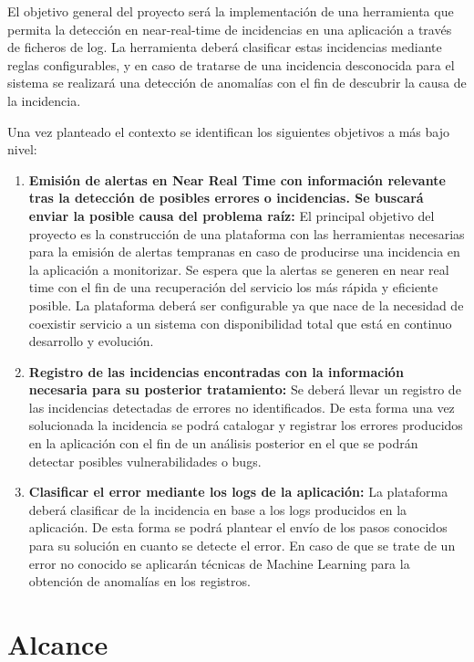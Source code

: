 El objetivo general del proyecto será la implementación de una herramienta que permita la detección en near-real-time de incidencias en una aplicación a través de ficheros de log. La herramienta deberá clasificar estas incidencias mediante reglas configurables, y en caso de tratarse de una incidencia desconocida para el sistema se realizará una detección de anomalías con el fin de descubrir la causa de la incidencia.

Una vez planteado el contexto se identifican los siguientes objetivos a más bajo nivel:

\begin{enumerate}
	\item \textbf{Emisión de alertas en Near Real Time con información relevante tras la detección de posibles errores o
incidencias. Se buscará enviar la posible causa del problema raíz:} El principal objetivo del proyecto es la construcción de una plataforma con las herramientas necesarias para la emisión de alertas tempranas en caso de producirse una incidencia en la aplicación a monitorizar. Se espera que la alertas se generen en near real time con el fin de una recuperación del servicio los más rápida y eficiente posible. La plataforma deberá ser configurable ya que nace de la necesidad de coexistir servicio a un sistema con disponibilidad total que está en continuo desarrollo y evolución.
	\item \textbf{Registro de las incidencias encontradas con la información necesaria para su posterior
tratamiento:} Se deberá llevar un registro de las incidencias detectadas de errores no identificados. De esta forma una vez solucionada la incidencia se podrá catalogar y registrar los errores producidos en la aplicación con el fin de un análisis posterior en el que se podrán detectar posibles vulnerabilidades o bugs.
	\item \textbf{Clasificar el error mediante los logs de la aplicación:} La plataforma deberá clasificar de la incidencia en base a los logs producidos en la aplicación. De esta forma se podrá plantear el envío de los pasos conocidos para su solución en cuanto se detecte el error. En caso de que se trate de un error no conocido se aplicarán técnicas de Machine Learning para la obtención de anomalías en los registros.
\end{enumerate}
	


\section{Alcance}

